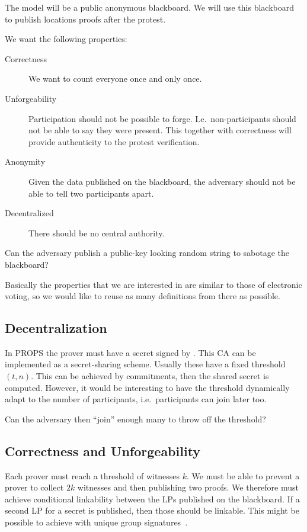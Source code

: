 The model will be a public anonymous blackboard.
We will use this blackboard to publish locations proofs after the protest.

We want the following properties:
\begin{description}
  \item[Correctness] We want to count everyone once and only once.
  \item[Unforgeability] Participation should not be possible to forge.
    I.e.\ non-participants should not be able to say they were present.
    This together with correctness will provide authenticity to the protest 
    verification.
  \item[Anonymity] Given the data published on the blackboard, the adversary 
    should not be able to tell two participants apart.
  \item[Decentralized] There should be no central authority.
\end{description}

Can the adversary publish a public-key looking random string to sabotage the 
blackboard?

Basically the properties that we are interested in are similar to those of 
electronic voting, so we would like to reuse as many definitions from there as 
possible.

\subsection{Decentralization}

In \ac{PROPS} the prover must have a secret signed by .
This \ac{CA} can be implemented as a secret-sharing scheme.
Usually these have a fixed threshold \((t, n)\).
This can be achieved by commitments, then the shared secret is computed.
However, it would be interesting to have the threshold dynamically adapt to the 
number of participants, i.e.\ participants can join later too.

Can the adversary then \enquote{join} enough many to throw off the threshold?

\subsection{Correctness and Unforgeability}

Each prover must reach a threshold of witnesses \(k\).
We must be able to prevent a prover to collect \(2k\) witnesses and then 
publishing two proofs.
We therefore must achieve conditional linkability between the \acp{LP} 
published on the blackboard.
If a second \ac{LP} for a secret is published, then those should be linkable.
This might be possible to achieve with unique group 
signatures~\cite{UniqueGroupSignatures,UniqueRingSignatures,ListSignatures}.


